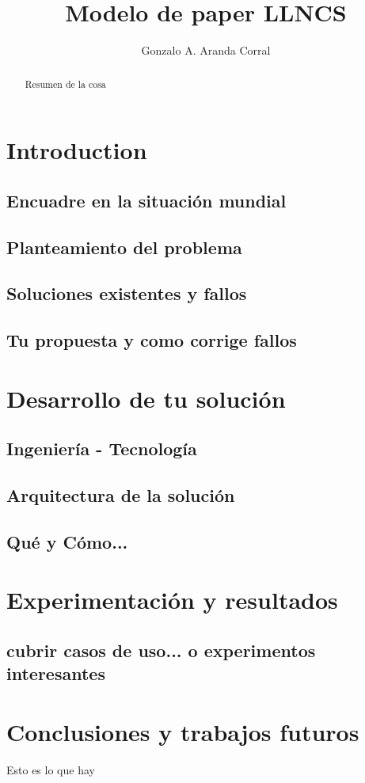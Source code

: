 \documentclass[]{llncs}
\author{Gonzalo A. Aranda Corral}
\title{Modelo de paper LLNCS}
\begin{document}
\maketitle
\begin{abstract}
Resumen de la cosa
\end{abstract}

\section{Introduction}
\subsection{Encuadre en la situación mundial}
\subsection{Planteamiento del problema}
\subsection{Soluciones existentes y fallos}
\subsection{Tu propuesta y como corrige fallos}

\section{Desarrollo de tu solución}
\subsection{Ingeniería - Tecnología}
\subsection{Arquitectura de la solución}
\subsection{Qué y Cómo...}

\section{Experimentación y resultados}
\subsection{cubrir casos de uso... o experimentos interesantes}

\section{Conclusiones y trabajos futuros}

\begin{thebibliography}{99}
\bibitem Esto es lo que hay
\end{thebibliography}
\end{document}
